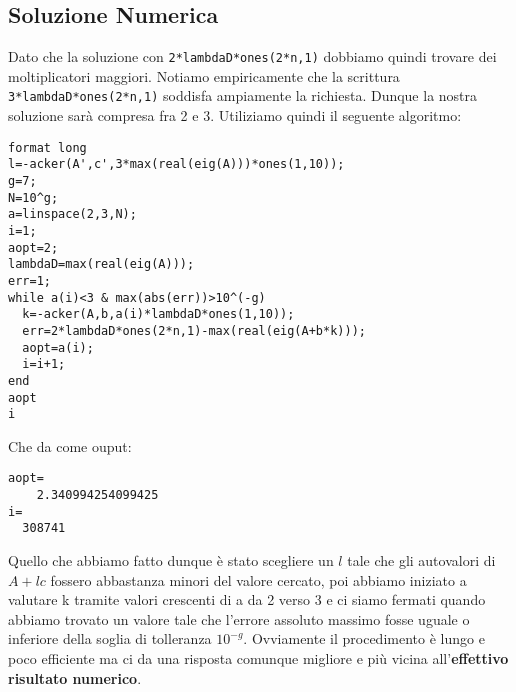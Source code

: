 \documentclass[a4paper]{report}
\begin{document}
\subsection*{Soluzione Numerica}
Dato che la soluzione con \verb|2*lambdaD*ones(2*n,1)| dobbiamo quindi
trovare dei moltiplicatori maggiori. Notiamo empiricamente che la scrittura
\verb|3*lambdaD*ones(2*n,1)| soddisfa ampiamente la richiesta. Dunque la nostra soluzione
sarà compresa fra 2 e 3. Utiliziamo quindi il seguente algoritmo:
\begin{verbatim}
format long
l=-acker(A',c',3*max(real(eig(A)))*ones(1,10));
g=7;
N=10^g;
a=linspace(2,3,N);
i=1;
aopt=2;
lambdaD=max(real(eig(A)));
err=1;
while a(i)<3 & max(abs(err))>10^(-g)
  k=-acker(A,b,a(i)*lambdaD*ones(1,10));
  err=2*lambdaD*ones(2*n,1)-max(real(eig(A+b*k)));
  aopt=a(i);
  i=i+1;
end
aopt
i
\end{verbatim}
\newpage
Che da come ouput:
\begin{verbatim}
aopt=
    2.340994254099425
i=
  308741
\end{verbatim}
Quello che abbiamo fatto dunque è stato scegliere un $l$ tale che
gli autovalori di $A+lc$ fossero abbastanza minori del valore cercato,
poi abbiamo iniziato a valutare k tramite valori crescenti di a da 2 verso 3
e ci siamo fermati quando abbiamo trovato un valore tale che l'errore
assoluto massimo fosse uguale o inferiore della soglia di tolleranza $10^{-g}$.
\newline
Ovviamente il procedimento è lungo e poco efficiente ma ci da una risposta
comunque migliore e più vicina all'\textbf{effettivo risultato numerico}.
\end{document}
